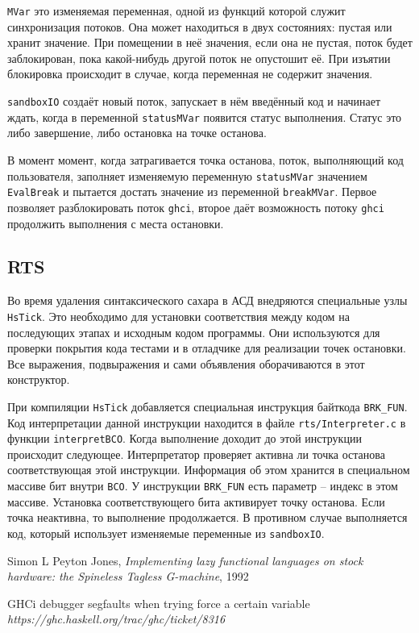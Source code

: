 \documentclass[fontsize=14pt, paper=a4, pagesize, DIV=calc]{scrartcl}
\def\code#1{\texttt{#1}}
\begin{document}
\code{MVar} это изменяемая переменная, одной из функций которой служит
синхронизация потоков. Она может находиться в двух состояниях: пустая или
хранит значение. При помещении в неё значения, если она не пустая, поток будет
заблокирован, пока какой-нибудь другой поток не опустошит её. При изъятии
блокировка происходит в случае, когда переменная не содержит значения.

\code{sandboxIO} создаёт новый поток, запускает в нём введённый код и начинает
ждать, когда в переменной \code{statusMVar} появится статус выполнения. Статус
это либо завершение, либо остановка на точке останова. 

В момент момент, когда затрагивается точка останова, поток, выполняющий код
пользователя, заполняет изменяемую переменную \code{statusMVar} значением
\code{EvalBreak} и пытается достать значение из переменной \code{breakMVar}.
Первое позволяет разблокировать поток \code{ghci}, второе даёт возможность
потоку \code{ghci} продолжить выполнения с места остановки.

\subsection{RTS}

Во время удаления синтаксического сахара в АСД внедряются специальные узлы
\code{HsTick}. Это необходимо для установки соответствия между кодом на
последующих этапах и исходным кодом программы. Они используются для проверки
покрытия кода тестами и в отладчике для реализации точек остановки. Все
выражения, подвыражения и сами объявления оборачиваются в этот конструктор.

При компиляции \code{HsTick} добавляется специальная инструкция байткода
\code{BRK\_FUN}. Код интерпретации данной инструкции находится в файле
\code{rts/Interpreter.c} в функции \code{interpretBCO}. Когда выполнение
доходит до этой инструкции происходит следующее. Интерпретатор проверяет
активна ли точка останова соответствующая этой инструкции. Информация об этом
хранится в специальном массиве бит внутри \code{BCO}. У инструкции
\code{BRK\_FUN} есть параметр -- индекс в этом массиве. Установка
соответствующего бита активирует точку останова.  Если точка неактивна, то
выполнение продолжается.  В противном случае выполняется код, который
использует изменяемые переменные из \code{sandboxIO}.

\begin{thebibliography}{9}

Simon L Peyton Jones,
\emph{Implementing lazy functional languages on stock hardware: the Spineless
Tagless G-machine}, 1992

GHCi debugger segfaults when trying force a certain variable
\emph{https://ghc.haskell.org/trac/ghc/ticket/8316}

\end{thebibliography}
\end{document}
